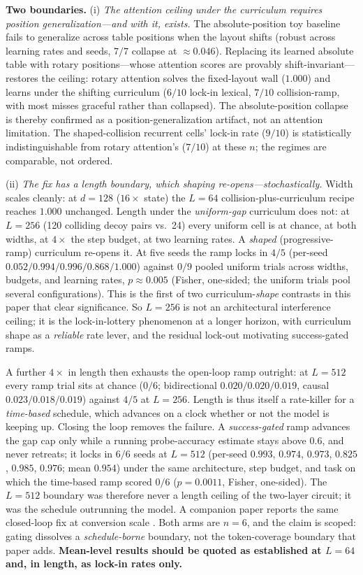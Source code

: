 \documentclass{article}
\begin{document}
\textbf{Two boundaries.} (i) \emph{The attention ceiling under the curriculum requires position generalization---and with it, exists.} The absolute-position toy baseline fails to generalize across table positions when the layout shifts (robust across learning rates and seeds, $7/7$ collapse at ${\approx}0.046$). Replacing its learned absolute table with rotary positions---whose attention scores are provably shift-invariant---restores the ceiling: rotary attention solves the fixed-layout wall ($1.000$) and learns under the shifting curriculum ($6/10$ lock-in lexical, $7/10$ collision-ramp, with most misses graceful rather than collapsed). The absolute-position collapse is thereby confirmed as a position-generalization artifact, not an attention limitation. The shaped-collision recurrent cells' lock-in rate ($9/10$) is statistically indistinguishable from rotary attention's ($7/10$) at these $n$; the regimes are comparable, not ordered.

(ii) \emph{The fix has a length boundary, which shaping re-opens---stochastically.} Width scales cleanly: at $d{=}128$ ($16\times$ state) the $L{=}64$ collision-plus-curriculum recipe reaches $1.000$ unchanged. Length under the \emph{uniform-gap} curriculum does not: at $L{=}256$ (120 colliding decoy pairs vs.\ 24) every uniform cell is at chance, at both widths, at $4\times$ the step budget, at two learning rates. A \emph{shaped} (progressive-ramp) curriculum re-opens it. At five seeds the ramp locks in $4/5$ (per-seed $0.052/0.994/0.996/0.868/1.000$) against $0/9$ pooled uniform trials across widths, budgets, and learning rates, $p{\approx}0.005$ (Fisher, one-sided; the uniform trials pool several configurations). This is the first of two curriculum-\emph{shape} contrasts in this paper that clear significance. So $L{=}256$ is not an architectural interference ceiling; it is the lock-in-lottery phenomenon at a longer horizon, with curriculum shape as a \emph{reliable} rate lever, and the residual lock-out motivating success-gated ramps.

A further $4\times$ in length then exhausts the open-loop ramp outright: at $L{=}512$ every ramp trial sits at chance ($0/6$; bidirectional $0.020/0.020/0.019$, causal $0.023/0.018/0.019$) against $4/5$ at $L{=}256$. Length is thus itself a rate-killer for a \emph{time-based} schedule, which advances on a clock whether or not the model is keeping up. Closing the loop removes the failure. A \emph{success-gated} ramp advances the gap cap only while a running probe-accuracy estimate stays above $0.6$, and never retreats; it locks in $6/6$ seeds at $L{=}512$ (per-seed $0.993$, $0.974$, $0.973$, $0.825$, $0.985$, $0.976$; mean $0.954$) under the same architecture, step budget, and task on which the time-based ramp scored $0/6$ ($p{=}0.0011$, Fisher, one-sided). The $L{=}512$ boundary was therefore never a length ceiling of the two-layer circuit; it was the schedule outrunning the model. A companion paper reports the same closed-loop fix at conversion scale \citep{dreaminggoose}. Both arms are $n{=}6$, and the claim is scoped: gating dissolves a \emph{schedule-borne} boundary, not the token-coverage boundary that paper adds. \textbf{Mean-level results should be quoted as established at $L{=}64$ and, in length, as lock-in rates only.}
\end{document}
